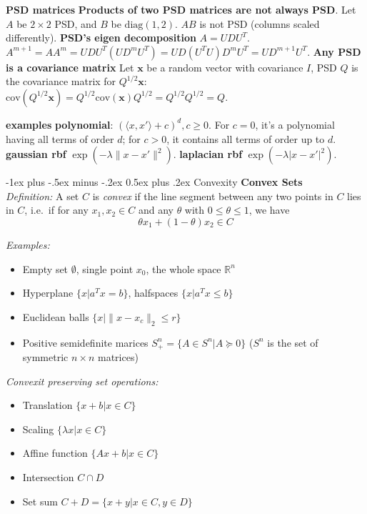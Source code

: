 \documentclass[10pt,landscape]{article}
\makeatletter
\newcommand{\vect}[1]{\boldsymbol{#1}}
\renewcommand{\section}{\@startsection{section}{1}{0mm}%
                                {-1ex plus -.5ex minus -.2ex}%
                                {0.5ex plus .2ex}%
                                {\normalfont\large\bfseries}}
\makeatother
\begin{document}
\begin{multicols}{3}
\textbf{PSD matrices} \textbf{Products of two PSD matrices are not always PSD}. Let $A$ be $2\times2$ PSD, and $B$ be $\mathrm{diag}(1,2)$. $AB$ is not PSD (columns scaled differently). \textbf{PSD's eigen decomposition} $A=UDU^T$. $A^{m+1} = AA^m = UDU^T(UD^m U^T) = UD(U^T U)D^m U^T = U D^{m+1} U^T$. \textbf{Any PSD is a covariance matrix} Let $\vect{x}$ be a random vector with covariance $I$, PSD $Q$ is the covariance matrix for $Q^{1/2} \vect{x}$: $\mathrm{cov}(Q^{1/2} \vect{x}) = Q^{1/2} \mathrm{cov}(\vect{x}) Q^{1/2} = Q^{1/2}Q^{1/2} = Q$.

\textbf{examples} \textbf{polynomial}: $(\langle x, x' \rangle + c)^d, c\geq 0$. For $c=0$, it's a polynomial having all terms of order $d$; for $c>0$, it contains all terms of order up to $d$. \textbf{gaussian rbf} $\exp(-\lambda\|x-x'\|^2)$. \textbf{laplacian rbf} $\exp(-\lambda|x-x'|^2)$.

\section{Convexity}
\textbf{Convex Sets} \\
\emph{Definition:} A set $C$ is \emph{convex} if the line segment between any two points in $C$ lies in $C$, i.e.\, if for any $x_1, x_2 \in C$ and any $\theta$ with $0 \leq \theta \leq 1$, we have \\
$$ \theta x_1 + (1 - \theta) x_2 \in C $$

\emph{Examples:}
\begin{itemize}
	\item Empty set $\emptyset$, single point ${x_0}$, the whole space $\mathbb{R}^n$
	\item Hyperplane $\{ x | a^T x = b \}$, halfspaces $\{ x | a^T x \leq b \}$
	\item Euclidean balls $\{ x | \| x - x_c \|_2 \leq r \}$
	\item Positive semidefinite marices $S_+^n = \{ A \in S^n | A \succeq 0 \}$ ($S^n$ is the set of symmetric $n \times n$ matrices)
\end{itemize}

\emph{Convexit preserving set operations:}
\begin{itemize}
	\item Translation $\{ x + b | x \in C \}$
	\item Scaling $\{ \lambda x | x \in C \}$
	\item Affine function $\{ Ax + b | x \in C\}$
	\item Intersection $C \cap D$
	\item Set sum $C + D = \{ x + y | x \in C, y \in D \}$
\end{itemize}


\end{multicols}
\end{document}
